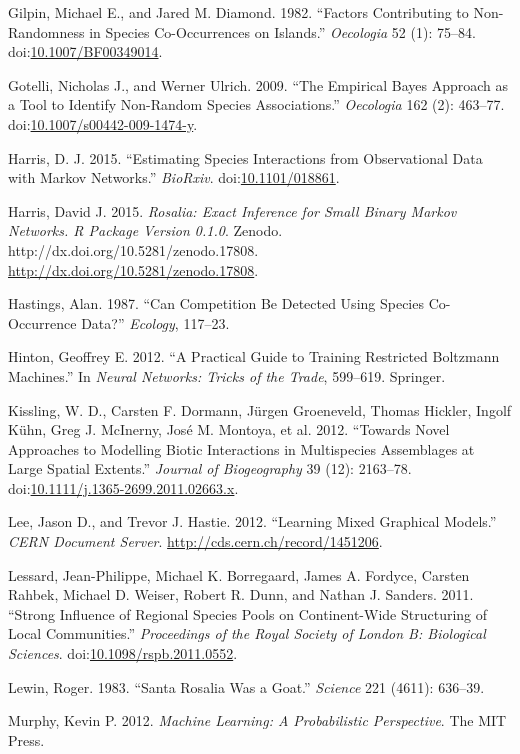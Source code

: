 Gilpin, Michael E., and Jared M. Diamond. 1982. ``Factors Contributing
to Non-Randomness in Species Co-Occurrences on Islands.''
\emph{Oecologia} 52 (1): 75--84.
doi:\href{http://dx.doi.org/10.1007/BF00349014}{10.1007/BF00349014}.

Gotelli, Nicholas J., and Werner Ulrich. 2009. ``The Empirical Bayes
Approach as a Tool to Identify Non-Random Species Associations.''
\emph{Oecologia} 162 (2): 463--77.
doi:\href{http://dx.doi.org/10.1007/s00442-009-1474-y}{10.1007/s00442-009-1474-y}.

Harris, D. J. 2015. ``Estimating Species Interactions from Observational
Data with Markov Networks.'' \emph{BioRxiv}.
doi:\href{http://dx.doi.org/10.1101/018861}{10.1101/018861}.

Harris, David J. 2015. \emph{Rosalia: Exact Inference for Small Binary
Markov Networks. R Package Version 0.1.0}. Zenodo.
http://dx.doi.org/10.5281/zenodo.17808.
\url{http://dx.doi.org/10.5281/zenodo.17808}.

Hastings, Alan. 1987. ``Can Competition Be Detected Using Species
Co-Occurrence Data?'' \emph{Ecology}, 117--23.

Hinton, Geoffrey E. 2012. ``A Practical Guide to Training Restricted
Boltzmann Machines.'' In \emph{Neural Networks: Tricks of the Trade},
599--619. Springer.

Kissling, W. D., Carsten F. Dormann, Jürgen Groeneveld, Thomas Hickler,
Ingolf Kühn, Greg J. McInerny, José M. Montoya, et al. 2012. ``Towards
Novel Approaches to Modelling Biotic Interactions in Multispecies
Assemblages at Large Spatial Extents.'' \emph{Journal of Biogeography}
39 (12): 2163--78.
doi:\href{http://dx.doi.org/10.1111/j.1365-2699.2011.02663.x}{10.1111/j.1365-2699.2011.02663.x}.

Lee, Jason D., and Trevor J. Hastie. 2012. ``Learning Mixed Graphical
Models.'' \emph{CERN Document Server}.
\url{http://cds.cern.ch/record/1451206}.

Lessard, Jean-Philippe, Michael K. Borregaard, James A. Fordyce, Carsten
Rahbek, Michael D. Weiser, Robert R. Dunn, and Nathan J. Sanders. 2011.
``Strong Influence of Regional Species Pools on Continent-Wide
Structuring of Local Communities.'' \emph{Proceedings of the Royal
Society of London B: Biological Sciences}.
doi:\href{http://dx.doi.org/10.1098/rspb.2011.0552}{10.1098/rspb.2011.0552}.

Lewin, Roger. 1983. ``Santa Rosalia Was a Goat.'' \emph{Science} 221
(4611): 636--39.

Murphy, Kevin P. 2012. \emph{Machine Learning: A Probabilistic
Perspective}. The MIT Press.

